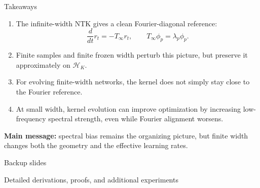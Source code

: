 \documentclass[10pt,aspectratio=169]{beamer}
\begin{document}
\begin{frame}{Takeaways}

	\begin{enumerate}
		\item The infinite-width NTK gives a clean Fourier-diagonal reference:
		      \[
			      \frac{d}{dt}r_t=-T_\infty r_t,
			      \qquad
			      T_\infty \phi_p=\lambda_p\phi_p.
		      \]

		\item Finite samples and finite frozen width perturb this picture, but preserve it approximately on \(\mathcal H_K\).

		\item For evolving finite-width networks, the kernel does not simply stay close to the Fourier reference.

		\item At small width, kernel evolution can improve optimization by increasing low-frequency spectral strength, even while Fourier alignment worsens.
	\end{enumerate}

	\vspace{0.25cm}

	\textbf{Main message:}
	spectral bias remains the organizing picture, but finite width changes both the geometry and the effective learning rates.

\end{frame}

\appendix

\begin{frame}[standout]
	Backup slides
	\vspace{0.4em}

	{\normalsize Detailed derivations, proofs, and additional experiments}
\end{frame}
\end{document}
